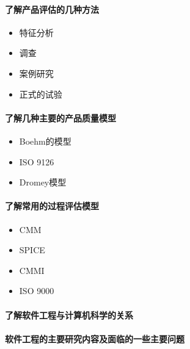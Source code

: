 \documentclass[UTF8,a4paper]{ctexart}
\begin{document}
\paragraph{了解产品评估的几种方法}
\begin{itemize}
  \item 特征分析
  \item 调查
  \item 案例研究
  \item 正式的试验
\end{itemize}

\paragraph{了解几种主要的产品质量模型}
\begin{itemize}
  \item Boehm的模型
  \item ISO 9126
  \item Dromey模型
\end{itemize}

\paragraph{了解常用的过程评估模型}
\begin{itemize}
  \item CMM
  \item SPICE
  \item CMMI
  \item ISO 9000
\end{itemize}

\paragraph{了解软件工程与计算机科学的关系}

\paragraph{软件工程的主要研究内容及面临的一些主要问题}
\end{document}
